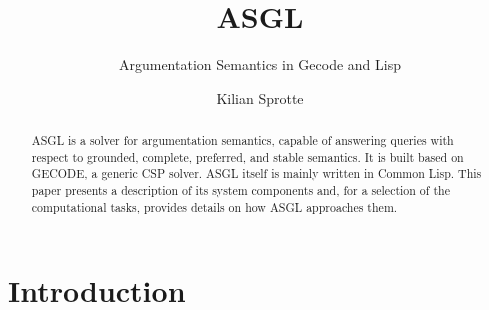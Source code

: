 \documentclass[runningheads,a4paper]{llncs}
\begin{document}
\mainmatter  %

\title{ASGL}
\subtitle{Argumentation Semantics in Gecode and Lisp}


%
%
\author{Kilian Sprotte}

%


%
%

\maketitle

\begin{abstract}
  ASGL is a solver for argumentation semantics, capable of answering
  queries with respect to grounded, complete, preferred, and stable
  semantics. It is built based on GECODE, a generic CSP solver. ASGL
  itself is mainly written in Common Lisp. This paper presents a
  description of its system components and, for a selection of the
  computational tasks, provides details on how ASGL approaches them.
\end{abstract}

\section{Introduction}\label{sec:introduction}
\end{document}

